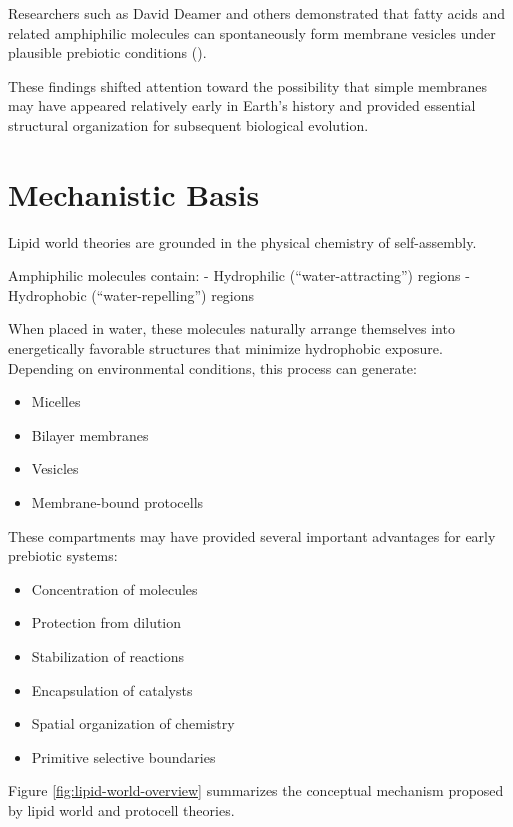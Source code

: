 \documentclass[
  oneside]{book}
\providecommand{\tightlist}{%
  \setlength{\itemsep}{0pt}\setlength{\parskip}{0pt}}
\begin{document}
Researchers such as David Deamer and others demonstrated that fatty acids and related amphiphilic molecules can spontaneously form membrane vesicles under plausible prebiotic conditions ().

These findings shifted attention toward the possibility that simple membranes may have appeared relatively early in Earth's history and provided essential structural organization for subsequent biological evolution.

\section{Mechanistic Basis}\label{mechanistic-basis-3}

Lipid world theories are grounded in the physical chemistry of self-assembly.

Amphiphilic molecules contain:
- Hydrophilic (``water-attracting'') regions
- Hydrophobic (``water-repelling'') regions

When placed in water, these molecules naturally arrange themselves into energetically favorable structures that minimize hydrophobic exposure. Depending on environmental conditions, this process can generate:

\begin{itemize}
\tightlist
\item
  Micelles
\item
  Bilayer membranes
\item
  Vesicles
\item
  Membrane-bound protocells
\end{itemize}

These compartments may have provided several important advantages for early prebiotic systems:

\begin{itemize}
\tightlist
\item
  Concentration of molecules
\item
  Protection from dilution
\item
  Stabilization of reactions
\item
  Encapsulation of catalysts
\item
  Spatial organization of chemistry
\item
  Primitive selective boundaries
\end{itemize}

Figure \ref{fig:lipid-world-overview} summarizes the conceptual mechanism proposed by lipid world and protocell theories.
\end{document}
